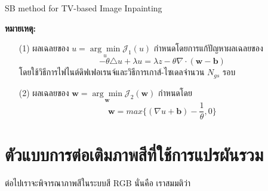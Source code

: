 	\begin{algorithm}[H]
		\SetAlgoNoLine
		\caption{SB method for TV-based Image Inpainting}    
		
	\end{algorithm}
	\vspace{0.5cm}
	\textbf{หมายเหตุ:}
	\begin{itemize}
		\item [(1)] ผลเฉลยของ $ u = \underset{u}{\arg\min} \mathcal{J}_1(u) $ กำหนดโดยการแก้ปัญหาผลเฉลยของ
		 $$ - \theta \triangle u + \lambda u = \lambda z - \theta \nabla \cdot (\boldsymbol{w}-\boldsymbol{b})$$ 
		 โดยใช้วิธีการไฟไนต์ดิฟเฟอเรนจ์และวิธีการเกาส์-ไซเดลจำนวน $N_{gs}$ รอบ
		\item [(2)] ผลเฉลยของ $ \boldsymbol{w} = \underset{\boldsymbol{w}}{\arg\min} \mathcal{J}_2(\boldsymbol{w}) $ กำหนดโดย $$\boldsymbol{w} = max\bigg\{(\nabla u + \boldsymbol{b}) - \frac{1}{\theta},0\bigg\}$$
	\end{itemize}

	\section{ตัวแบบการต่อเติมภาพสีที่ใช้การแปรผันรวม}\label{inpaint-model-color}

	\hspace{1cm} ต่อไปเราจะพิจารณาภาพสีในระบบสี RGB นั่นคือ เราสมมติว่า
	
